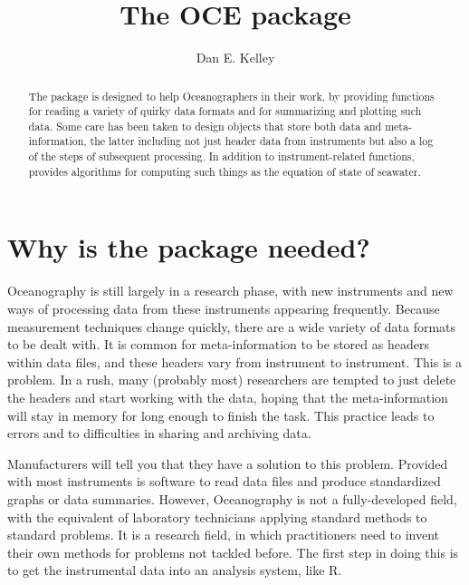 \documentclass{article}
\begin{document}
\title{The OCE package}
\author{Dan E. Kelley}
\maketitle


\begin{abstract}

The \verb@oce@ package is designed to help Oceanographers in their
work, by providing functions for reading a variety of quirky data
formats and for summarizing and plotting such data.  Some care has
been taken to design objects that store both data and
meta-information, the latter including not just header data from
instruments but also a log of the steps of subsequent processing.  In
addition to instrument-related functions, \verb@oce@ provides
algorithms for computing such things as the equation of state of
seawater.

\end{abstract}

\section{Why is the package needed?}

Oceanography is still largely in a research phase, with new instruments and new ways of
processing data from these instruments appearing frequently. Because measurement techniques
change quickly, there are a wide variety of data formats to be dealt with. It is common for
meta-information to be stored as headers within data files, and these headers vary from
instrument to instrument. This is a problem. In a rush, many (probably most) researchers are
tempted to just delete the headers and start working with the data, hoping that the
meta-information will stay in memory for long enough to finish the task. This practice leads to
errors and to difficulties in sharing and archiving data.

Manufacturers will tell you that they have a solution to this problem. Provided with most
instruments is software to read data files and produce standardized graphs or data summaries.
However, Oceanography is not a fully-developed field, with the equivalent of laboratory
technicians applying standard methods to standard problems. It is a research field, in which
practitioners need to invent their own methods for problems not tackled before. The first step
in doing this is to get the instrumental data into an analysis system, like R.
\end{document}
